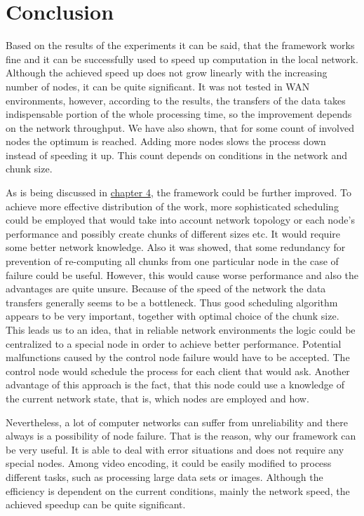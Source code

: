 \chapter*{Conclusion}
Based on the results of the experiments it can be said, that the framework works fine and it can be successfully used to speed up computation in the local network. Although the achieved speed up does not grow linearly with the increasing number of nodes, it can be quite significant. It was not tested in WAN environments, however, according to the results, the transfers of the data takes indispensable portion of the whole processing time, so the improvement depends on the network throughput. We have also shown, that for some count of involved nodes the optimum is reached. Adding more nodes slows the process down instead of speeding it up. This count depends on conditions in the network and chunk size.

As is being discussed in \hyperref[Problems-alternatives-and-possible-improvements]{chapter 4}, the framework could be further improved. To achieve more effective distribution of the work, more sophisticated scheduling could be employed that would take into account network topology or each node's performance and possibly create chunks of different sizes etc. It would require some better network knowledge. Also it was showed, that some redundancy for prevention of re-computing all chunks from one particular node in the case of failure could be useful. However, this would cause worse performance and also the advantages are quite unsure. Because of the speed of the network the data transfers generally seems to be a bottleneck. Thus good scheduling algorithm appears to be very important, together with optimal choice of the chunk size. This leads us to an idea, that in reliable network environments the logic could be centralized to a special node in order to achieve better performance. Potential malfunctions caused by the control node failure would have to be accepted. The control node would schedule the process for each client that would ask. Another advantage of this approach is the fact, that this node could use a knowledge of the current network state, that is, which nodes are employed and how.

Nevertheless, a lot of computer networks can suffer from unreliability and there always is a possibility of node failure. That is the reason, why our framework can be very useful. It is able to deal with error situations and does not require any special nodes. Among video encoding, it could be easily modified to process different tasks, such as processing large data sets or images. Although the efficiency is dependent on the current conditions, mainly the network speed, the achieved speedup can be quite significant.